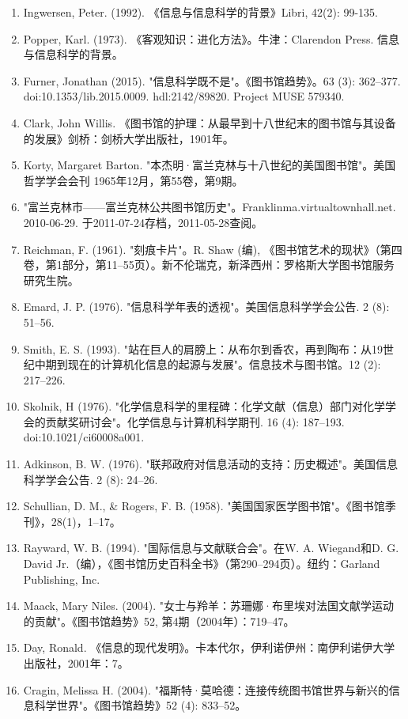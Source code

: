 \begin{enumerate}
\item Ingwersen, Peter. (1992). 《信息与信息科学的背景》Libri, 42(2): 99-135.  
\item Popper, Karl. (1973). 《客观知识：进化方法》。牛津：Clarendon Press. 信息与信息科学的背景。  
\item Furner, Jonathan (2015). "信息科学既不是"。《图书馆趋势》。63 (3): 362–377. doi:10.1353/lib.2015.0009. hdl:2142/89820. Project MUSE 579340.  
\item Clark, John Willis. 《图书馆的护理：从最早到十八世纪末的图书馆与其设备的发展》剑桥：剑桥大学出版社，1901年。  
\item Korty, Margaret Barton. "本杰明·富兰克林与十八世纪的美国图书馆"。美国哲学学会会刊 1965年12月，第55卷，第9期。  
\item "富兰克林市——富兰克林公共图书馆历史"。Franklinma.virtualtownhall.net. 2010-06-29. 于2011-07-24存档，2011-05-28查阅。  
\item Reichman, F. (1961). "刻痕卡片"。R. Shaw (编), 《图书馆艺术的现状》（第四卷，第1部分，第11–55页）。新不伦瑞克，新泽西州：罗格斯大学图书馆服务研究生院。  
\item Emard, J. P. (1976). "信息科学年表的透视"。美国信息科学学会公告. 2 (8): 51–56.  
\item Smith, E. S. (1993). "站在巨人的肩膀上：从布尔到香农，再到陶布：从19世纪中期到现在的计算机化信息的起源与发展"。信息技术与图书馆。12 (2): 217–226.  
\item Skolnik, H (1976). "化学信息科学的里程碑：化学文献（信息）部门对化学学会的贡献奖研讨会"。化学信息与计算机科学期刊. 16 (4): 187–193. doi:10.1021/ci60008a001.  
\item Adkinson, B. W. (1976). "联邦政府对信息活动的支持：历史概述"。美国信息科学学会公告. 2 (8): 24–26.  
\item Schullian, D. M., & Rogers, F. B. (1958). "美国国家医学图书馆"。《图书馆季刊》，28(1)，1–17。  
\item Rayward, W. B. (1994). "国际信息与文献联合会"。在W. A. Wiegand和D. G. David Jr.（编），《图书馆历史百科全书》（第290–294页）。纽约：Garland Publishing, Inc.  
\item Maack, Mary Niles. (2004). "女士与羚羊：苏珊娜·布里埃对法国文献学运动的贡献"。《图书馆趋势》52, 第4期（2004年）：719–47。  
\item Day, Ronald. 《信息的现代发明》。卡本代尔，伊利诺伊州：南伊利诺伊大学出版社，2001年：7。  
\item Cragin, Melissa H. (2004). "福斯特·莫哈德：连接传统图书馆世界与新兴的信息科学世界"。《图书馆趋势》52 (4): 833–52。  

\end{enumerate}
